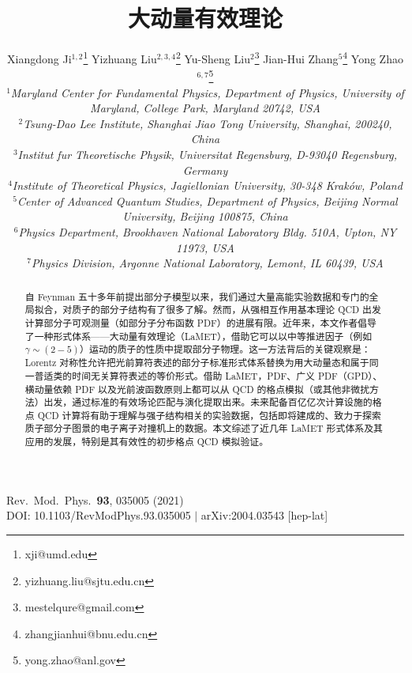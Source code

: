 \documentclass[11pt]{ctexart}
\title{{\LARGE\bfseries 大动量有效理论}}
\author{
Xiangdong Ji$^{1,2}$\footnote{xji@umd.edu}\quad
Yizhuang Liu$^{2,3,4}$\footnote{yizhuang.liu@sjtu.edu.cn}\quad
Yu-Sheng Liu$^{2}$\footnote{mestelqure@gmail.com}\quad
Jian-Hui Zhang$^{5}$\footnote{zhangjianhui@bnu.edu.cn}\quad
Yong Zhao$^{6,7}$\footnote{yong.zhao@anl.gov}\\[0.9em]
\normalsize\itshape
$^{1}$Maryland Center for Fundamental Physics, Department of Physics, University of Maryland,
College Park, Maryland 20742, USA\\[2pt]
$^{2}$Tsung-Dao Lee Institute, Shanghai Jiao Tong University, Shanghai, 200240, China\\[2pt]
$^{3}$Institut fur Theoretische Physik, Universitat Regensburg, D-93040 Regensburg, Germany\\[2pt]
$^{4}$Institute of Theoretical Physics, Jagiellonian University, 30-348 Krak\'ow, Poland\\[2pt]
$^{5}$Center of Advanced Quantum Studies, Department of Physics, Beijing Normal University, Beijing 100875, China\\[2pt]
$^{6}$Physics Department, Brookhaven National Laboratory Bldg. 510A, Upton, NY 11973, USA\\[2pt]
$^{7}$Physics Division, Argonne National Laboratory, Lemont, IL 60439, USA
}
\date{}
\begin{document}
\maketitle

\vspace{-6em}
\begin{flushright}\small
Rev.\ Mod.\ Phys.\ \textbf{93}, 035005 (2021)\\
DOI: 10.1103/RevModPhys.93.035005 \quad $\vert$ \quad arXiv:2004.03543 [hep-lat]
\end{flushright}

\renewcommand{\abstractname}{摘要}
\begin{abstract}
自 Feynman 五十多年前提出部分子模型以来，我们通过大量高能实验数据和专门的全局拟合，对质子的部分子结构有了很多了解。然而，从强相互作用基本理论 QCD 出发计算部分子可观测量（如部分子分布函数 PDF）的进展有限。近年来，本文作者倡导了一种形式体系——大动量有效理论（LaMET），借助它可以以中等推进因子（例如 $\gamma\sim (2-5)$）运动的质子的性质中提取部分子物理。这一方法背后的关键观察是：Lorentz 对称性允许把光前算符表述的部分子标准形式体系替换为用大动量态和属于同一普适类的时间无关算符表述的等价形式。借助 LaMET，PDF、广义 PDF（GPD）、横动量依赖 PDF 以及光前波函数原则上都可以从 QCD 的格点模拟（或其他非微扰方法）出发，通过标准的有效场论匹配与演化提取出来。未来配备百亿亿次计算设施的格点 QCD 计算将有助于理解与强子结构相关的实验数据，包括即将建成的、致力于探索质子部分子图景的电子离子对撞机上的数据。本文综述了近几年 LaMET 形式体系及其应用的发展，特别是其有效性的初步格点 QCD 模拟验证。
\end{abstract}

\tableofcontents{}
\clearpage









\end{document}
